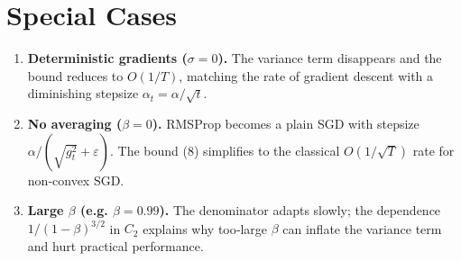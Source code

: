 \documentclass{article}
\begin{document}
\section*{Special Cases}
\begin{enumerate}[label=\alph*.]
\item \textbf{Deterministic gradients ($\sigma=0$).}  
The variance term disappears and the bound reduces to $O(1/T)$, matching the rate of gradient descent with a diminishing stepsize $\alpha_{t}= \alpha/\sqrt{t}$.
\item \textbf{No averaging ($\beta=0$).}  
RMSProp becomes a plain SGD with stepsize $\alpha/(\sqrt{g_{t}^{2}}+\varepsilon)$. The bound (8) simplifies to the classical $O(1/\sqrt{T})$ rate for non‑convex SGD.
\item \textbf{Large $\beta$ (e.g. $\beta=0.99$).}  
The denominator adapts slowly; the dependence $1/(1-\beta)^{3/2}$ in $C_{2}$ explains why too‑large $\beta$ can inflate the variance term and hurt practical performance.
\end{enumerate}
\end{document}
